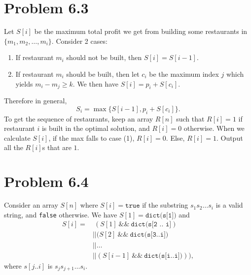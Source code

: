 \documentclass[12pt]{report}
\newcommand{\co}{\texttt}
\renewcommand{\and}{\ \&\& \ }
\begin{document}
\section{Problem 6.3}
Let $S[i]$ be the maximum total profit we get from building some restaurants in $\{m_1, m_2, \ldots, m_i\}$. Consider 2 cases:
\begin{enumerate}[(1)]
  \item If restaurant $m_i$ should not be built, then $S[i] = S[i-1]$.
  \item If restaurant $m_i$ should be built, then let $c_i$ be the maximum index $j$ which yields $m_i - m_j \ge k$. We then have $\displaystyle S[i] = p_i + S[c_i]$.
\end{enumerate}
Therefore in general, $$S_i = \max \{ S[i-1], p_i + S[c_i]\}.$$
To get the sequence of restaurants, keep an array $R[n]$ such that $R[i] = 1$ if restaurant $i$ is built in the optimal solution, and $R[i] = 0$ otherwise. When we calculate $S[i]$, if the max falls to case (1), $R[i] = 0$. Else, $R[i] = 1$. Output all the $R[i]$s that are $1$.

\section{Problem 6.4}
Consider an array $S[n]$ where $S[i] = \co{true}$ if the substring $s_1 s_2 \ldots s_i$ is a valid string, and \co{false} otherwise. We have $S[1] = \co{dict(s[1])}$ and 
$$
\begin{aligned}
S[i] = & \ (S[1] \and \co{dict(s[2 .. i]}) \\ 
& || (S[2] \and \co{dict(s[3..i])} \\ 
& || \ldots \\
& || (S[i-1] \and \co{dict(s[i..i])})), 
\end{aligned}$$
where $s[j..i]$ is $s_j s_{j+1} \ldots s_i$.
\end{document}
